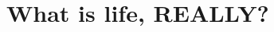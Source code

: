 \documentclass[DIV=calc, paper=a4, fontsize=12pt]{scrartcl}	 %
\begin{document}


\section*{What is life, REALLY?}

\begin{multicols}{2}





\end{multicols}

\onecolumn


\end{document}

